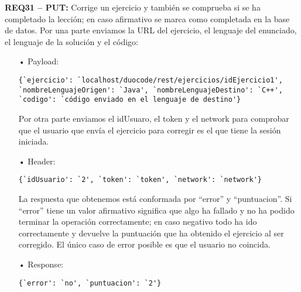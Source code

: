\textbf{REQ31 – PUT:} Corrige un ejercicio y también se comprueba si se ha completado la lección; en caso afirmativo se marca como completada en la base de datos. Por una parte enviamos la URL del ejercicio, el lenguaje del enunciado, el lenguaje de la solución y el código:

\begin{itemize}
\item[•]
Payload: 
{\codesize
\begin{verbatim}
{`ejercicio': `localhost/duocode/rest/ejercicios/idEjercicio1', 
`nombreLenguajeOrigen': `Java', `nombreLenguajeDestino': `C++', 
`codigo': `código enviado en el lenguaje de destino'} 
\end{verbatim}
}

Por otra parte enviamos el idUsuaro, el token y el network para comprobar que el usuario que envía el ejercicio para corregir es el que tiene la sesión iniciada.
\item[•]
Header: 
{\codesize
\begin{verbatim}
{`idUsuario': `2', `token': `token', `network': `network'}
\end{verbatim}
}

La respuesta que obtenemos está conformada por ``error'' y ``puntuacion''. Si ``error'' tiene un valor afirmativo significa que algo ha fallado y no ha podido terminar la operación correctamente; en caso negativo todo ha ido correctamente y devuelve la puntuación que ha obtenido el ejercicio al ser corregido. El único caso de error posible es que el usuario no coincida.
\item[•]
Response: 
{\codesize
\begin{verbatim}
{`error': `no', `puntuacion': `2'}
\end{verbatim}
}
\end{itemize}
